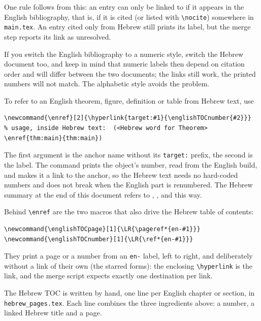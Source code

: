 One rule follows from this: an entry can only be linked to if it appears in the English bibliography, that is, if it is cited (or listed with \verb|\nocite|) somewhere in \texttt{main.tex}. An entry cited only from Hebrew still prints its label, but the merge step reports its link as unresolved.

If you switch the English bibliography to a numeric style, switch the Hebrew document too, and keep in mind that numeric labels then depend on citation order and will differ between the two documents; the links still work, the printed numbers will not match. The alphabetic style avoids the problem.


To refer to an English theorem, figure, definition or table from Hebrew text, use

\begin{lstlisting}
\newcommand{\enref}[2]{\hyperlink{target:#1}{\englishTOCnumber{#2}}}
% usage, inside Hebrew text:  (<Hebrew word for Theorem> \enref{thm:main}{thm:main})
\end{lstlisting}

The first argument is the anchor name without its \texttt{target:} prefix, the second is the label.
The command prints the object's number, read from the English build, and makes it a link to the anchor, so the Hebrew text needs no hard-coded numbers and does not break when the English part is renumbered.
The Hebrew summary at the end of this document refers to , ,  and  this way.

Behind \verb|\enref| are the two macros that also drive the Hebrew table of contents:

\begin{lstlisting}
\newcommand{\englishTOCpage}[1]{\LR{\pageref*{en-#1}}}
\newcommand{\englishTOCnumber}[1]{\LR{\ref*{en-#1}}}
\end{lstlisting}

They print a page or a number from an \texttt{en-} label, left to right, and deliberately without a link of their own (the starred forms): the enclosing \verb|\hyperlink| is the link, and the merge script expects exactly one destination per link.

\label{sec:hebrewtoc}

The Hebrew TOC is written by hand, one line per English chapter or section, in \texttt{hebrew\_pages.tex}.
Each line combines the three ingredients above: a number, a linked Hebrew title and a page.

